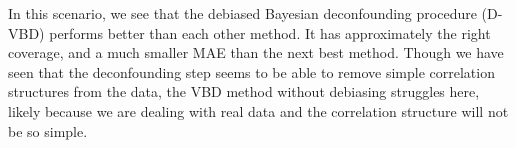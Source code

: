 \documentclass[11pt]{article}
\begin{document}
In this scenario, we see that the debiased Bayesian deconfounding procedure (D-VBD) performs better than each other method. It has approximately the right coverage, and a much smaller MAE than the next best method. Though we have seen that the deconfounding step seems to be able to remove simple correlation structures from the data, the VBD method without debiasing struggles here, likely because we are dealing with real data and the correlation structure will not be so simple. 

\begin{table}
\centering
{}
\caption{Performance on the riboflavin dataset. Metrics are the mean over 100 MC replications for 100 randomly sampled coordinates.}
\label{Tab:riboflavin}
\end{table}
\end{document}
